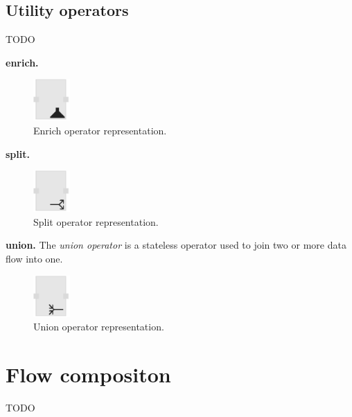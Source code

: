 \subsection{Utility operators}
TODO

\textbf{enrich.}
\begin{figure}[ht]
	\centering
	\includegraphics[height=60px]{figures/EnrichOperator.pdf}
	\caption{Enrich operator representation.}
	\label{fig:enrichoperator}
\end{figure}

\textbf{split.}
\begin{figure}[ht]
	\centering
	\includegraphics[height=60px]{figures/SplitOperator.pdf}
	\caption{Split operator representation.}
	\label{fig:splitoperator}
\end{figure}

\textbf{union.}
The \textit{union operator} is a stateless operator used to join two or more data flow 
into one.

\begin{figure}[ht]
	\centering
	\includegraphics[height=60px]{figures/UnionOperator.pdf}
	\caption{Union operator representation.}
	\label{fig:unionoperator}
\end{figure}

\section{Flow compositon}
TODO